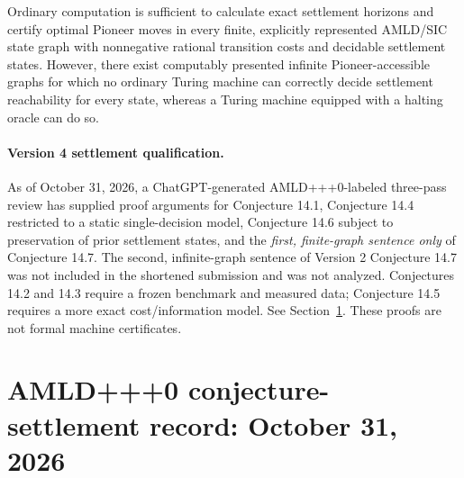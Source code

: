 \documentclass[11pt]{article}
\theoremstyle{definition}
\theoremstyle{remark}
\begin{document}
\begin{description}[style=nextline,leftmargin=2.0em,itemsep=1.0em]
\item[Conjecture 14.7 --- Oracle hierarchy and computational sufficiency.] Ordinary computation is sufficient to calculate exact settlement horizons and certify optimal Pioneer moves in every finite, explicitly represented AMLD/SIC state graph with nonnegative rational transition costs and decidable settlement states. However, there exist computably presented infinite Pioneer-accessible graphs for which no ordinary Turing machine can correctly decide settlement reachability for every state, whereas a Turing machine equipped with a halting oracle can do so.
\end{description}

\paragraph{Version 4 settlement qualification.} As of October 31, 2026, a ChatGPT-generated AMLD+++0-labeled three-pass review has supplied proof arguments for Conjecture 14.1, Conjecture 14.4 restricted to a static single-decision model, Conjecture 14.6 subject to preservation of prior settlement states, and the \emph{first, finite-graph sentence only} of Conjecture 14.7. The second, infinite-graph sentence of Version 2 Conjecture 14.7 was not included in the shortened submission and was not analyzed. Conjectures 14.2 and 14.3 require a frozen benchmark and measured data; Conjecture 14.5 requires a more exact cost/information model. See Section~\ref{sec:settlement}. These proofs are not formal machine certificates.


\section{AMLD+++0 conjecture-settlement record: October 31, 2026}
\label{sec:settlement}
\noindent{}
\end{document}

